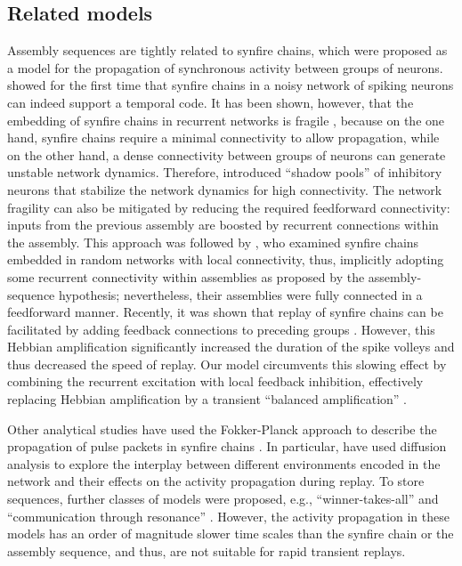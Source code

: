   \subsection{Related models}
    Assembly sequences are tightly related to synfire chains, which were
    proposed \citep{Abeles1991} as a model for the propagation of synchronous
    activity between groups of neurons. \cite{Diesmann1999}
    showed for the first time that synfire chains in a noisy network of spiking
    neurons can indeed support a temporal code. It has been shown, however,
    that the embedding of synfire chains in recurrent networks is fragile
    \citep{Aviel2003, Mehring2003}, because on the one hand, synfire chains
    require a minimal connectivity to allow propagation, while on the other
    hand, a dense connectivity between groups of neurons can generate unstable
    network dynamics. Therefore, \cite{Aviel2004} introduced
    ``shadow pools'' of inhibitory neurons that stabilize the network dynamics
    for high connectivity. The network fragility can also be mitigated by
    reducing the required feedforward connectivity: inputs from the previous
    assembly are boosted by recurrent connections within the assembly. This
    approach was followed by \cite{Kumar2008}, who examined
    synfire chains embedded in random networks with local connectivity, thus,
    implicitly adopting some recurrent connectivity within assemblies as
    proposed by the assembly-sequence hypothesis; nevertheless, their
    assemblies were fully connected in a feedforward manner. Recently, it was
    shown that replay of synfire chains can be facilitated by adding feedback
    connections to preceding groups \citep{Moldakarimov2015}. However, this
    Hebbian amplification significantly increased the duration of the spike
    volleys and thus decreased the speed of replay. Our model circumvents this
    slowing effect by combining the recurrent excitation with local feedback
    inhibition, effectively replacing Hebbian amplification by a transient
    ``balanced amplification'' \citep{Murphy2009}. 

    Other analytical studies have used the Fokker-Planck approach to describe
    the propagation of pulse packets in synfire chains \citep{Cateau2001,
    Gerstner2002}. In particular, \cite{Monasson2014} have
    used diffusion analysis to explore the interplay between different
    environments encoded in the network and their effects on the activity
    propagation during replay. To store sequences, further classes of models
    were proposed, e.g., ``winner-takes-all'' \citep{Klampfl2013, Kappel2014,
    Mostafa2014} and ``communication through resonance'' \citep{Hahn2014}.
    However, the activity propagation in these models has an order of magnitude
    slower time scales than the synfire chain or the assembly sequence, and
    thus, are not suitable for rapid transient replays.

